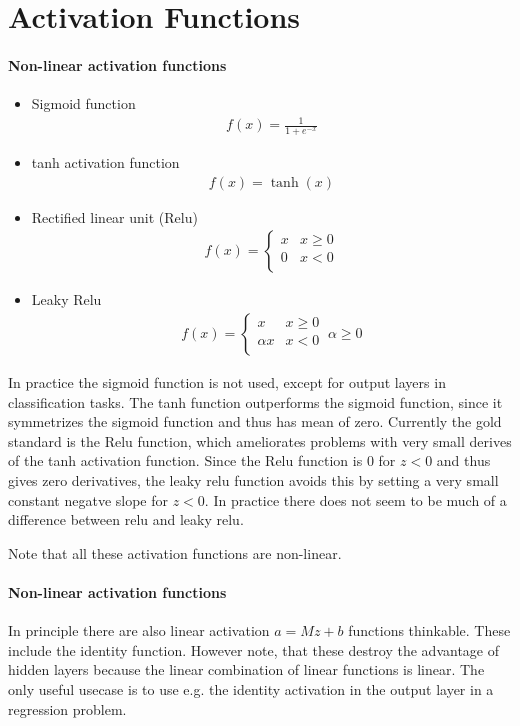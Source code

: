 \documentclass[12pt,a4paper]{article}
\begin{document}
\section{Activation Functions}
\paragraph{Non-linear activation functions}
\begin{itemize}
\item Sigmoid function
\begin{align}
	f(x) = \frac{1}{1+e^{-x}}
\end{align}
\item tanh activation function
\begin{align}
	f(x)=\tanh(x)
\end{align}
\item Rectified linear unit (Relu)
\begin{align}
f (x) = \left\{
\begin{array}{ll}
x & x \geq 0 \\
0 &  x < 0  \\
\end{array}
\right. 
\end{align}
\item Leaky Relu
\begin{align}
f (x) = \left\{
\begin{array}{ll}
x & x \geq 0 \\
\alpha x &  x < 0  \\
\end{array}
\right. ~ \alpha \geq 0
\end{align}
\end{itemize}
In practice the sigmoid function is not used, except for output layers in classification tasks.
The tanh function outperforms the sigmoid function, since it symmetrizes the sigmoid function and thus has mean of zero. 
Currently the gold standard is the Relu function, which ameliorates problems with very small derives of the tanh activation function. Since the Relu function is $0$ for $z<0$ and thus gives zero derivatives, the leaky relu function avoids this by setting a very small constant negatve slope for $z<0$. In practice there does not seem to be much of a difference between relu and leaky relu.  

Note that all these activation functions are non-linear.

\paragraph{Non-linear activation functions}
In principle there are also linear activation $a=Mz +b$ functions thinkable. These include the identity function. However note, that these destroy the advantage of hidden layers because the linear combination of linear functions is linear. The only useful usecase is to use e.g. the identity activation in the output layer in a regression problem. 
\end{document}
